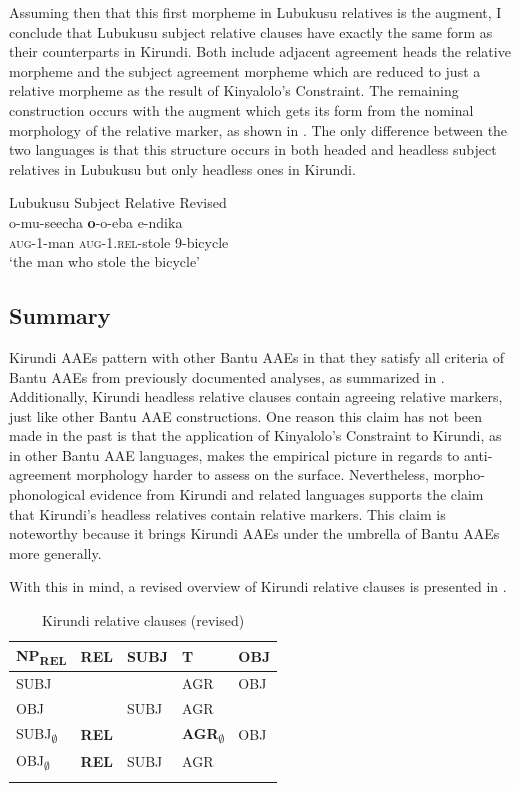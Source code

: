 \documentclass[output=paper,colorlinks,citecolor=brown
]{langscibook}
\begin{document}
Assuming then that this first morpheme in Lubukusu relatives is the augment, I conclude that Lubukusu subject relative clauses have exactly the same form as their counterparts in Kirundi. Both include adjacent agreement heads \textendash{} the relative morpheme and the subject agreement morpheme \textendash{} which are reduced to just a relative morpheme as the result of Kinyalolo's Constraint. The remaining construction occurs with the augment which gets its form from the nominal morphology of the relative marker, as shown in . The only difference between the two languages is that this structure occurs in both headed and headless subject relatives in Lubukusu but only headless ones in Kirundi.

\ea \label{ex:myers:lubukusu4} Lubukusu Subject Relative Revised \\
\gll o-mu-seecha {\bfseries  o}-o-eba e-ndika\\
\textsc{aug}-1-man \textsc{aug}-\textsc{1.rel}-stole 9-bicycle\\
\glt `the man who stole the bicycle'
\z
 
\subsection{Summary} \label{sec:myers:sumsum}

Kirundi AAEs pattern with other Bantu AAEs in that they satisfy all criteria of Bantu AAEs from previously documented analyses, as summarized in . Additionally, Kirundi headless relative clauses contain agreeing relative markers, just like other Bantu AAE constructions. One reason this claim has not been made in the past is that the application of Kinyalolo's Constraint to Kirundi, as in other Bantu AAE languages, makes the empirical picture in regards to anti-agreement morphology harder to assess on the surface. Nevertheless, morpho-phonological evidence from Kirundi and related languages supports the claim that Kirundi's headless relatives contain relative markers. This claim is noteworthy because it brings Kirundi AAEs under the umbrella of Bantu AAEs more generally. 

 With this in mind, a revised overview of Kirundi relative clauses is presented in .


\begin{table}
\caption{Kirundi relative clauses (revised)}
\label{tab:myers:sumsum}
 \begin{tabular}{lllll}
  \lsptoprule
NP\textsubscript{REL} & REL & SUBJ & T & OBJ\\
  \midrule
  SUBJ     &  & & AGR & OBJ  \\
OBJ      &  & SUBJ & AGR &  \\ 
 \rowcolor{lightgray}   SUBJ\textsubscript{$\emptyset$}  &  {\bfseries  REL} & & {\bfseries  AGR\textsubscript{$\emptyset$}} & OBJ  \\
 \rowcolor{lightgray}   OBJ\textsubscript{$\emptyset$}  & {\bfseries  REL} & SUBJ & AGR &  \\
  \lspbottomrule
 \end{tabular}
\end{table}
\end{document}
